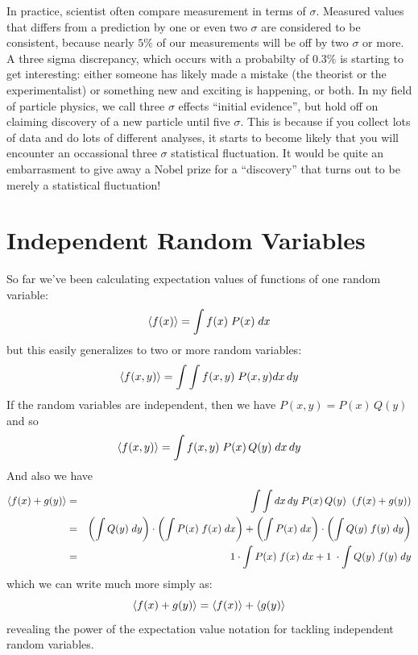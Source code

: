 \documentclass[12pt,oneside]{book}
\begin{document}
In practice, scientist often compare measurement in terms of $\sigma$.
Measured values that differs from a prediction by one or even two
$\sigma$ are considered to be consistent, because nearly
$5\%$ of our measurements will be off by two $\sigma$ or more.  A
three sigma discrepancy, which occurs with a probabilty of $0.3\%$ is
starting to get interesting: either someone has likely made a mistake
(the theorist or the experimentalist) or something new and exciting is
happening, or both.  In my field of particle physics, we call three
$\sigma$ effects ``initial evidence'', but hold off on claiming
discovery of a new particle until five $\sigma$.  This is because if
you collect lots of data and do lots of different analyses, it starts
to become likely that you will encounter an occassional three $\sigma$
statistical fluctuation.  It would be quite an embarrasment to give
away a Nobel prize for a ``discovery'' that turns out to be merely a
statistical fluctuation!

\section{Independent Random Variables}

So far we've been calculating expectation values of functions of one random variable: 
\begin{displaymath}
\braket{f(x)} = \int f(x) \; P(x) \; dx
\end{displaymath}
but this easily generalizes to two or more random variables:
\begin{displaymath}
\braket{f(x,y)} = \int \int f(x,y) \; P(x,y) dx \, dy 
\end{displaymath}
If the random variables are independent, then we have $P(x,y) = P(x) \, Q(y)$ and so
\begin{displaymath}
\braket{f(x,y)} = \int f(x,y) \; P(x) \, Q(y) \; dx \, dy
\end{displaymath}
And also we have
\begin{eqnarray*}
\braket{f(x)+g(y)} &=& \int \int dx \, dy \; P(x) \, Q(y) \;\; (f(x) + g(y)) \\
&=& \left(\int Q(y) \; dy \right) \cdot \left( \int P(x) \; f(x) \; dx  \right) 
+ \left(\int P(x) \; dx \right) \cdot \left( \int Q(y) \; f(y) \; dy  \right)\\
&=& 1 \cdot \int P(x) \; f(x) \; dx  + 1 \; \cdot \int Q(y) \; f(y) \; dy \\
\end{eqnarray*}
which we can write much more simply as:
\begin{displaymath}
\braket{f(x)+g(y)} = \braket{f(x)}+\braket{g(y)}
\end{displaymath}
revealing the power of the expectation value notation for tackling independent random variables.
\end{document}
